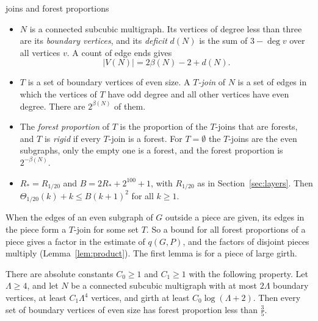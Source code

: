 \begin{notation}{joins and forest proportions}
\begin{itemize}[leftmargin=1.2em]
\item $N$ is a connected subcubic multigraph. Its vertices of degree less than three are its
\emph{boundary vertices}, and its \emph{deficit} $d(N)$ is the sum of $3-\deg v$ over all
vertices $v$. A count of edge ends gives
\begin{equation}\label{eq:deficit}
  |V(N)|=2\beta(N)-2+d(N).
\end{equation}
\item $T$ is a set of boundary vertices of even size. A \emph{$T$-join} of $N$ is a set of edges
in which the vertices of $T$ have odd degree and all other vertices have even degree. There are
$2^{\beta(N)}$ of them.
\item The \emph{forest proportion} of $T$ is the proportion of the $T$-joins that are forests,
and $T$ is \emph{rigid} if every $T$-join is a forest. For $T=\emptyset$ the $T$-joins are the
even subgraphs, only the empty one is a forest, and the forest proportion is $2^{-\beta(N)}$.
\item $R_{*}=R_{1/20}$ and $B=2R_{*}+2^{100}+1$, with $R_{1/20}$ as in
Section~\ref{sec:layers}. Then $\Theta_{1/20}(k)+k\le B(k+1)^{2}$ for all $k\ge1$.
\end{itemize}
\end{notation}

When the edges of an even subgraph of $G$ outside a piece are given, its edges in the piece form
a $T$-join for some set $T$. So a bound for all forest proportions of a piece gives a factor in
the estimate of $q(G,P)$, and the factors of disjoint pieces multiply (Lemma~\ref{lem:product}).
The first lemma is for a piece of large girth.

\begin{lemma}\label{lem:affine}
There are absolute constants $C_0\ge1$ and $C_1\ge1$ with the following property. Let $\Lambda\ge4$,
and let $N$ be a connected subcubic multigraph with at most $2\Lambda$ boundary vertices, at
least $C_1\Lambda^{4}$ vertices, and girth at least $C_0\log(\Lambda+2)$. Then every set of
boundary vertices of even size has forest proportion less than $\frac35$.
\end{lemma}

